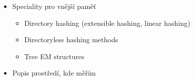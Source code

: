 \begin{itemize}
\item Speciality pro vnější paměť
	\begin{itemize}
		\item Directory hashing (extensible hashing, linear hashing)
		\item Directoryless hashing methods
		\item Tree EM structures
	\end{itemize}


\item Popis prostředí, kde měřím
\end{itemize}

